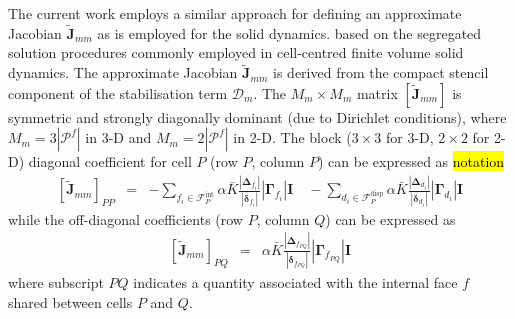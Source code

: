\documentclass[sn-mathphys,Numbered]{sn-jnl}%
\newcommand{\bb}{\boldsymbol}
\begin{document}
The current work employs a similar approach for defining an approximate Jacobian $\tilde{\bb{J}}_{mm}$ as is employed for the solid dynamics. based on the segregated solution procedures commonly employed in cell-centred finite volume solid dynamics.
The approximate Jacobian $\tilde{\bb{J}}_{mm}$ is derived from the compact stencil component of the stabilisation term $\bb{\mathcal{D}}_m$.
The $M_m \times M_m$ matrix $\left[ \bb{\tilde{J}}_{mm} \right]$ is symmetric and strongly diagonally dominant (due to Dirichlet conditions), where $M_m = 3|\mathcal{P}^f|$ in 3-D and $M_m = 2|\mathcal{P}^f|$ in 2-D.
The block ($3\times3$ for 3-D, $2\times2$ for 2-D) diagonal coefficient for cell $P$ (row $P$, column $P$) can be expressed as \hl{notation}
\begin{eqnarray}
	 \left[ \tilde{\bb{J}}_{mm} \right]_{PP} &=&
		- \sum_{f_i \in \mathcal{F}^{\text{int}}_P}  \alpha \bar{K}
		\frac{ \left|\bb{\Delta}_{f_i} \right| }{\left|\bb{\delta}_{f_i}\right|}    \left|\bb{\Gamma}_{f_i}\right| \textbf{I} 
	    \quad-  \sum_{d_i \in \mathcal{F}^{\text{disp}}_P}  \alpha \bar{K}
		 \frac{ \left|\bb{\Delta}_{d_i} \right| }{\left|\bb{\delta}_{d_i}\right|} 
		\left|\bb{\Gamma}_{d_i}\right| \textbf{I} %
\end{eqnarray}
while the off-diagonal coefficients (row $P$, column $Q$) can be expressed as
\begin{eqnarray}
	\left[\tilde{\bb{J}}_{mm} \right] _{PQ} &=&
		\alpha \bar{K} \frac{ \left|\bb{\Delta}_{f_{PQ}} \right| }{\left|\bb{\delta}_{f_{PQ}}\right|} \left|\bb{\Gamma}_{f_{PQ}}\right| \textbf{I} 
\end{eqnarray}
where subscript $PQ$ indicates a quantity associated with the internal face $f$ shared between cells $P$ and $Q$.
\end{document}
